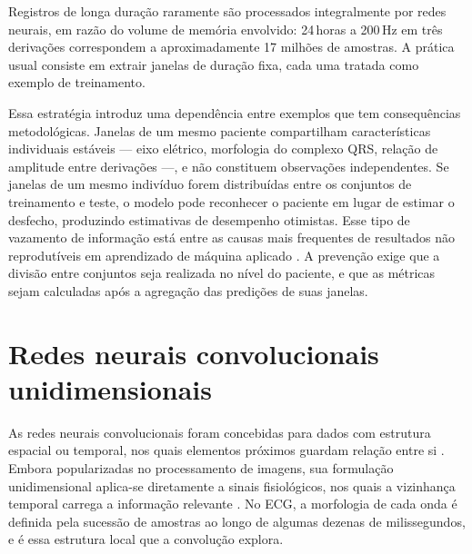 Registros de longa duração raramente são processados integralmente por redes
neurais, em razão do volume de memória envolvido: 24\,horas a 200\,Hz em três
derivações correspondem a aproximadamente 17 milhões de amostras. A prática
usual consiste em extrair janelas de duração fixa, cada uma tratada como
exemplo de treinamento.

Essa estratégia introduz uma dependência entre exemplos que tem consequências
metodológicas. Janelas de um mesmo paciente compartilham características
individuais estáveis --- eixo elétrico, morfologia do complexo QRS, relação de
amplitude entre derivações ---, e não constituem observações independentes.
Se janelas de um mesmo indivíduo forem distribuídas entre os conjuntos de
treinamento e teste, o modelo pode reconhecer o paciente em lugar de estimar
o desfecho, produzindo estimativas de desempenho otimistas. Esse tipo de
vazamento de informação está entre as causas mais frequentes de resultados
não reprodutíveis em aprendizado de máquina aplicado
\cite{kapoor2023leakage}. A prevenção exige que a divisão entre conjuntos seja
realizada no nível do paciente, e que as métricas sejam calculadas após a
agregação das predições de suas janelas.


%
%
%

\section{Redes neurais convolucionais unidimensionais}
\label{sec:fund-cnn}

As redes neurais convolucionais foram concebidas para dados com estrutura
espacial ou temporal, nos quais elementos próximos guardam relação entre si
\cite{lecun1998gradient}. Embora popularizadas no processamento de imagens,
sua formulação unidimensional aplica-se diretamente a sinais fisiológicos,
nos quais a vizinhança temporal carrega a informação relevante
\cite{kiranyaz2021onedimensional}. No \gls{ECG}, a morfologia de cada onda
é definida pela sucessão de amostras ao longo de algumas dezenas de
milissegundos, e é essa estrutura local que a convolução explora.

